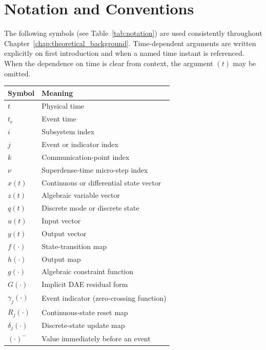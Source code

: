 \section*{Notation and Conventions}
\label{sec:20_notation_and_conventions}

The following symbols (see Table~\ref{tab:notation}) are used consistently throughout Chapter~\ref{chap:theoretical_background}.
Time-dependent arguments are written explicitly on first introduction and when a named time instant is referenced.
When the dependence on time is clear from context, the argument $(t)$ may be omitted.

\begin{table}[htbp]
    \centering
    \small
    \begin{tabular}{ll}
        \toprule
        Symbol & Meaning \\
        \midrule
        $t$ & Physical time \\
        $t_\mathrm{e}$ & Event time \\
        $i$ & Subsystem index \\
        $j$ & Event or indicator index \\
        $k$ & Communication-point index \\
        $\nu$ & Superdense-time micro-step index \\
        $x(t)$ & Continuous or differential state vector \\
        $z(t)$ & Algebraic variable vector \\
        $q(t)$ & Discrete mode or discrete state \\
        $u(t)$ & Input vector \\
        $y(t)$ & Output vector \\
        $f(\cdot)$ & State-transition map \\
        $h(\cdot)$ & Output map \\
        $g(\cdot)$ & Algebraic constraint function \\
        $G(\cdot)$ & Implicit DAE residual form \\
        $\gamma_j(\cdot)$ & Event indicator (zero-crossing function) \\
        $R_j(\cdot)$ & Continuous-state reset map \\
        $\delta_j(\cdot)$ & Discrete-state update map \\
        $(\cdot)^-$ & Value immediately before an event \\

\end{tabular}
\end{table}
